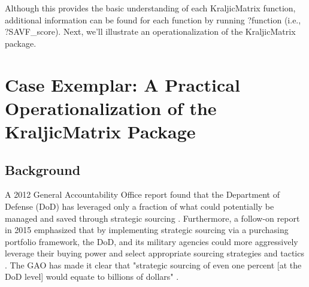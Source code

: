 \documentclass[twocolumn]{svjour3}       %
\begin{document}
Although this provides the basic understanding of each KraljicMatrix function, additional information can be found for each function by running ?function (i.e., ?SAVF\_score).  Next, we'll illustrate an operationalization of the KraljicMatrix package. 


\section{Case Exemplar: A Practical Operationalization of the KraljicMatrix Package}
\label{sec:5}


\subsection{Background}
\label{sec:5.1}

A 2012 General Accountability Office \citep{gao} report found that the Department of Defense (DoD) has leveraged only a fraction of what could potentially be managed and saved through strategic sourcing \citep{gao}.  Furthermore, a follow-on report in 2015 emphasized that by implementing strategic sourcing via a purchasing portfolio framework, the DoD, and its military agencies could more aggressively leverage their buying power and select appropriate sourcing strategies and tactics \citep{gao2}.  The GAO has made it clear that "strategic sourcing of even one percent [at the DoD level] would equate to billions of dollars" \citep{gao}.

\end{document}
